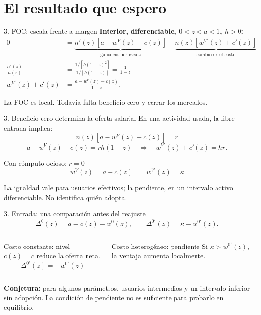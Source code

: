 \documentclass[aspectratio=169,11pt]{beamer}
\begin{document}
\section{El resultado que espero}
\begin{frame}{3. FOC: escala frente a margen}
\textbf{Interior, diferenciable, $0<z<a<1$, $h>0$:}
\begin{align*}
0&=\underbrace{n'(z)[a-w^V(z)-c(z)]}_{\text{ganancia por escala}}
-\underbrace{n(z)[w^{V\prime}(z)+c'(z)]}_{\text{cambio en el costo}}\\[3pt]
\frac{n'(z)}{n(z)}&=\frac{1/[h(1-z)^2]}{1/[h(1-z)]}=\frac1{1-z}\\[3pt]
w^{V\prime}(z)+c'(z)&=\frac{a-w^V(z)-c(z)}{1-z}.
\end{align*}
\begin{keybox}
La FOC es local. Todavía falta beneficio cero y cerrar los mercados.
\end{keybox}
\end{frame}
\begin{frame}{3. Beneficio cero determina la oferta salarial}
En una actividad usada, la libre entrada implica:
\[n(z)[a-w^V(z)-c(z)]=r\]
\[a-w^V(z)-c(z)=rh(1-z)\quad\Longrightarrow\quad w^{V\prime}(z)+c'(z)=hr.\]
\begin{block}{Con cómputo ocioso: $r=0$}
\[\boxed{w^V(z)=a-c(z)}\qquad\boxed{w^{V\prime}(z)=\kappa}\]
\end{block}
La igualdad vale para usuarios efectivos; la pendiente, en un intervalo activo diferenciable. \alert{No identifica quién adopta.}
\end{frame}
\begin{frame}{3. Entrada: una comparación antes del reajuste}
\[\Delta^0(z)=a-c(z)-w^0(z),\qquad\Delta^{0\prime}(z)=\kappa-w^{0\prime}(z).\]
\begin{columns}[T]
\begin{block}{Costo constante: nivel}
$c(z)=\bar c$ reduce la oferta neta.
\[\Delta^{0\prime}(z)=-w^{0\prime}(z)\]
\end{block}
\begin{block}{Costo heterogéneo: pendiente}
Si $\kappa>w^{0\prime}(z)$, la ventaja aumenta localmente.
\end{block}
\end{columns}
\medskip
\textbf{Conjetura:} para algunos parámetros, usuarios intermedios y un intervalo inferior sin adopción. La condición de pendiente no es suficiente para probarlo en equilibrio.
\end{frame}
\end{document}
